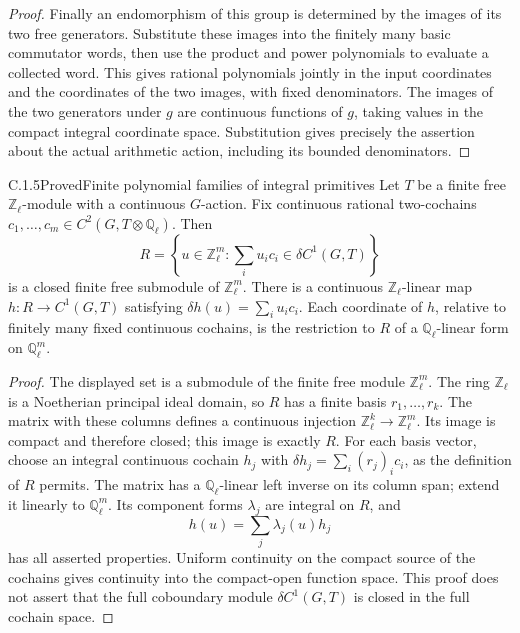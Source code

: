\begin{proof}
Finally an endomorphism of this group is determined by the
images of its two free generators. Substitute these images into
the finitely many basic commutator words, then use the product
and power polynomials to evaluate a collected word. This gives
rational polynomials jointly in the input coordinates and the
coordinates of the two images, with fixed denominators. The
images of the two generators under \(g\) are continuous functions
of \(g\), taking values in the compact integral coordinate space.
Substitution gives precisely the assertion about the actual
arithmetic action, including its bounded denominators.
\end{proof}

\begin{result}{C.1.5}{Proved}{Finite polynomial families of integral primitives}
\label{lem:ghost-primitive-family}
Let \(T\) be a finite free \(\mathbb Z_\ell\)-module with a
continuous \(G\)-action. Fix continuous rational two-cochains
\(c_1,\ldots,c_m\in C^2(G,T\otimes\mathbb Q_\ell)\). Then
\[
 R=\left\{u\in\mathbb Z_\ell^m:
       \sum_i u_i c_i\in\delta C^1(G,T)\right\}
\]
is a closed finite free submodule of \(\mathbb Z_\ell^m\).
There is a continuous \(\mathbb Z_\ell\)-linear map
\(h:R\to C^1(G,T)\) satisfying
\(\delta h(u)=\sum_i u_i c_i\). Each coordinate of \(h\),
relative to finitely many fixed continuous cochains, is the
restriction to \(R\) of a \(\mathbb Q_\ell\)-linear form on
\(\mathbb Q_\ell^m\).
\end{result}
\begin{proof}
The displayed set is a submodule of the finite free module
\(\mathbb Z_\ell^m\). The ring \(\mathbb Z_\ell\) is a
Noetherian principal ideal domain, so \(R\) has a finite basis
\(r_1,\ldots,r_k\). The matrix with these columns defines a
continuous injection \(\mathbb Z_\ell^k\to\mathbb Z_\ell^m\).
Its image is compact and therefore closed; this image is exactly
\(R\). For each basis vector, choose an integral continuous
cochain \(h_j\) with
\(\delta h_j=\sum_i(r_j)_i c_i\), as the definition of \(R\)
permits. The matrix has a \(\mathbb Q_\ell\)-linear left inverse
on its column span; extend it linearly to \(\mathbb Q_\ell^m\).
Its component forms \(\lambda_j\) are integral on \(R\), and
\[
                    h(u)=\sum_j\lambda_j(u)h_j
\]
has all asserted properties. Uniform continuity on the compact
source of the cochains gives continuity into the compact-open
function space. This proof does not assert that the full coboundary
module \(\delta C^1(G,T)\) is closed in the full cochain space.
\end{proof}

